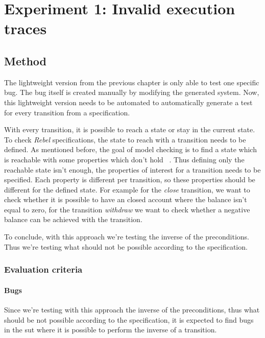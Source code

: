 \chapter{Experiment 1: Invalid execution traces}\label{sec:ch4}


\section{Method}

The lightweight version from the previous chapter is only able to test one specific
bug. The bug itself is created manually by modifying the generated system. Now,
this lightweight version needs to be automated to automatically generate a test
for every transition from a specification.

With every transition, it is possible to reach a state or stay in the current
state. To check \textit{Rebel} specifications, the state to reach with a transition needs
to be defined. As mentioned before, the goal of model checking is to find a
state which is reachable with some properties which don't hold
~\cite[p.5]{stoel_storm_vinju_bosman_2016}. Thus defining only the reachable
state isn't enough, the properties of interest for a transition needs to be
specified. Each property is different per transition, so these properties should
be different for the defined state. For example for the \textit{close}
transition, we want to check whether it is possible to have an closed account
where the balance isn't equal to zero, for the transition \textit{withdraw} we
want to check whether a negative balance can be achieved with the transition.

To conclude, with this approach we're testing the inverse of the preconditions. Thus we're testing
what should not be possible according to the specification.

\subsection{Evaluation criteria}\label{sec:ch4-eval-criteria}

\subsubsection{Bugs}
Since we're testing with this approach the inverse of the preconditions, thus
what should be not possible according to the specification, it is expected to
find bugs in the \gls{sut} where it is possible to perform the inverse of a
transition.

